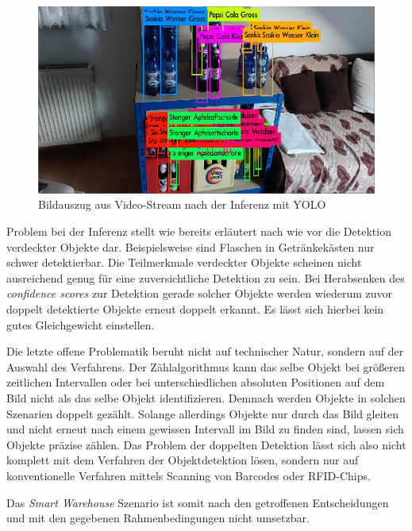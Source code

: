 \begin{figure}[H]
	\begin{center}
		\includegraphics[width=13cm]{Bilder/yolo_inference.png} 
		\caption{Bildauszug aus Video-Stream nach der Inferenz mit YOLO}
		\label{yolo_inference}
	\end{center}
\end{figure}

Problem bei der Inferenz stellt wie bereits erläutert nach wie vor die Detektion verdeckter Objekte dar. Beispielsweise sind Flaschen in Getränkekästen nur schwer detektierbar. Die Teilmerkmale verdeckter Objekte scheinen nicht ausreichend genug für eine zuversichtliche Detektion zu sein. Bei Herabsenken des \textit{confidence scores} zur Detektion gerade solcher Objekte werden wiederum zuvor doppelt detektierte Objekte erneut doppelt erkannt. Es lässt sich hierbei kein gutes Gleichgewicht einstellen.

Die letzte offene Problematik beruht nicht auf technischer Natur, sondern auf der Auswahl des Verfahrens. Der Zählalgorithmus kann das selbe Objekt bei größeren zeitlichen Intervallen oder bei unterschiedlichen absoluten Positionen auf dem Bild nicht als das selbe Objekt identifizieren. Demnach werden Objekte in solchen Szenarien doppelt gezählt. Solange allerdings Objekte nur durch das Bild \glqq gleiten\grqq{} und nicht erneut nach einem gewissen Intervall im Bild zu finden sind, lassen sich Objekte präzise zählen. Das Problem der doppelten Detektion lässt sich also nicht komplett mit dem Verfahren der Objektdetektion lösen, sondern nur auf konventionelle Verfahren mittels Scanning von Barcodes oder RFID-Chips. 

Das \textit{Smart Warehouse} Szenario ist somit nach den getroffenen Entscheidungen und mit den gegebenen Rahmenbedingungen nicht umsetzbar.

